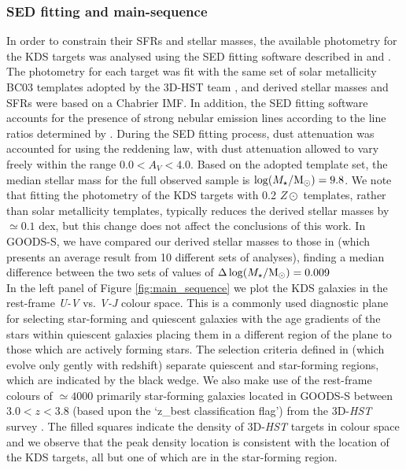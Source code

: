 \documentclass[fleqn,usenatbib]{mnras}
\begin{document}
\subsubsection{SED fitting and main-sequence}\label{subsubsec:sed_fitting}
In order to constrain their SFRs and stellar masses, the available photometry for the KDS targets was analysed using the SED fitting software described in \cite{McLure2011} and \cite{McLeod2015}.
The photometry for each target was fit with the same set of solar metallicity BC03 \citep{Bruzual2003} templates adopted by the 3D-HST team \cite{Momcheva2016}, and derived stellar masses and SFRs were based on a Chabrier IMF.
In addition, the SED fitting software accounts for the presence of strong nebular emission lines according to the line ratios determined by \cite{Cullen2014}.
During the SED fitting process, dust attenuation was accounted for using the \cite{Calzetti2000} reddening law, with dust attenuation allowed to vary freely within the range $0.0<A_{V}<4.0$.
Based on the adopted template set, the median stellar mass for the full observed sample is $\log(M_{\star}/{\rm M}_{\odot}) = 9.8$. 
We note that fitting the photometry of the KDS targets with 0.2 $Z\odot$ templates, rather than solar metallicity templates, typically reduces the derived stellar masses by $\simeq0.1$ dex, but this change does not affect the conclusions of this work.
In GOODS-S, we have compared our derived stellar masses to those in \cite{Santini2015} (which presents an average result from 10 different sets of analyses), finding a median difference between the two sets of values of $\Delta \log(M_{\star}/{\rm M}_{\odot}) = 0.009$ \\

In the left panel of Figure \ref{fig:main_sequence} we plot the KDS galaxies in the rest-frame {\it U-V} vs. {\it V-J} colour space.
This is a commonly used diagnostic plane for selecting star-forming and quiescent galaxies \citep[e.g.][]{Williams2009,Brammer2011,Whitaker2012a} with the age gradients of the stars within quiescent galaxies placing them in a different region of the plane to those which are actively forming stars.
The selection criteria defined in \cite{Whitaker2012a} (which evolve only gently with redshift) separate quiescent and star-forming regions, which are indicated by the black wedge.
We also make use of the rest-frame colours of $\simeq4000$ primarily star-forming galaxies located in GOODS-S between $3.0 < z < 3.8$ (based upon the `z\_best classification flag') from the 3D-{\em HST} survey \citep{Brammer2012,Momcheva2016}.
The filled squares indicate the density of 3D-{\em HST} targets in colour space and we observe that the peak density location is consistent with the location of the KDS targets, all but one of which are in the star-forming region. 
\end{document}
